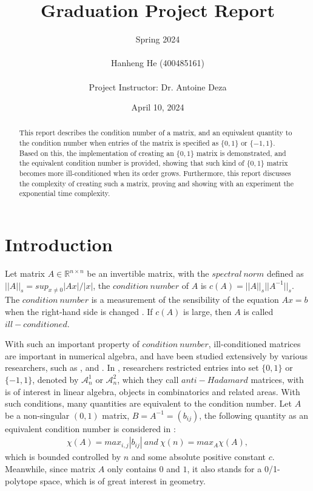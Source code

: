 \documentclass[11pt]{article}
\title{\textbf{ Graduation Project Report }}
\author{Spring 2024 \\ \\ Hanheng He (400485161) \\ \\ Project Instructor: Dr. Antoine Deza }
\date{April 10, 2024}
\begin{document}
\maketitle

\pagestyle{fancy}

\begin{abstract}
    This report describes the condition number of a matrix, and an equivalent quantity to the condition number when entries of the matrix is specified as $\{0, 1\}$ or $\{-1, 1\}$. Based on this, the implementation of creating an $\{0, 1\}$ matrix is demonstrated, and the equivalent condition number is provided, showing that such kind of $\{0, 1\}$ matrix becomes more ill-conditioned when its order grows. Furthermore, this report discusses the complexity of creating such a matrix, proving and showing with an experiment the exponential time complexity.
\end{abstract}
\tableofcontents



\pagebreak
\section{Introduction}

Let matrix $A \in \mathbb{R}^{n\times n}$ be an invertible matrix, with the $spectral \ norm$ defined as $||A||_s = sup_{x\neq0}|Ax|/|x|$, the $condition\ number$ of $A$ is $c(A) = ||A||_s||A^{-1}||_s$. The $condition\ number$ is a measurement of the sensibility of the equation $Ax = b$ when the right-hand side is changed \cite{ALON1997133}. If $c(A)$ is large, then $A$ is called $ill-conditioned$.

With such an important property of $condition\ number$, ill-conditioned matrices are important
in numerical algebra, and have been studied extensively by various researchers, such as \cite{doi:10.1137/1018113}, \cite{wilkinson1972note} and \cite{neumaier1998solving}. In \cite{GRAHAM1984113}, researchers restricted entries into set $\{0, 1\}$ or $\{-1, 1\}$, denoted by $\mathcal{A}_n^1$ or $\mathcal{A}_n^2$, which they call $anti-Hadamard$ matrices, with is of interest in linear algebra, objects in combinatorics and related areas. With such conditions, many quantities are equivalent to the condition number. Let $A$ be a non-singular $(0, 1)$ matrix, $B = A^{-1} = (b_{ij})$, the following quantity as an equivalent condition number is considered in \cite{GRAHAM1984113}:
\begin{align*}
\chi(A) = max_{i, j}|b_{ij}|\ and\ \chi(n) = max_A \chi(A),
\end{align*}
which is bounded controlled by $n$ and some absolute positive constant $c$. Meanwhile, since matrix $A$ only contains $0$ and $1$, it also stands for a 0/1-polytope space, which is of great interest in geometry.
\end{document}
